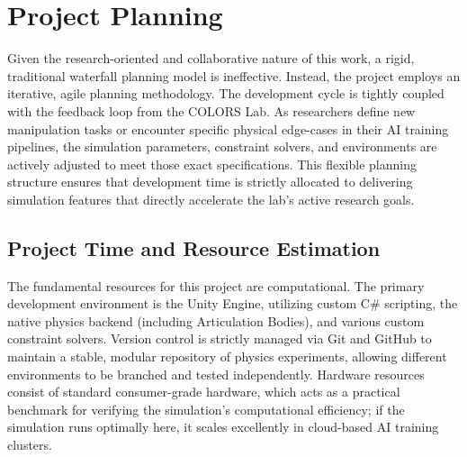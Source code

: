 \documentclass[a4paper,12pt]{report}
\begin{document}
\section{Project Planning}
Given the research-oriented and collaborative nature of this work, a rigid, traditional waterfall planning model is ineffective. Instead, the project employs an iterative, agile planning methodology. The development cycle is tightly coupled with the feedback loop from the COLORS Lab. As researchers define new manipulation tasks or encounter specific physical edge-cases in their AI training pipelines, the simulation parameters, constraint solvers, and environments are actively adjusted to meet those exact specifications. This flexible planning structure ensures that development time is strictly allocated to delivering simulation features that directly accelerate the lab's active research goals.

\subsection{Project Time and Resource Estimation}
The fundamental resources for this project are computational. The primary development environment is the Unity Engine, utilizing custom C\# scripting, the native physics backend (including Articulation Bodies), and various custom constraint solvers. Version control is strictly managed via Git and GitHub to maintain a stable, modular repository of physics experiments, allowing different environments to be branched and tested independently. Hardware resources consist of standard consumer-grade hardware, which acts as a practical benchmark for verifying the simulation's computational efficiency; if the simulation runs optimally here, it scales excellently in cloud-based AI training clusters.
\end{document}
